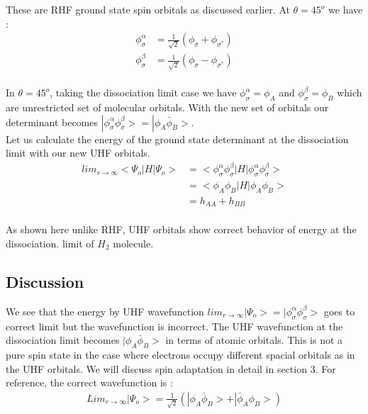 \documentclass[11pt]{article}   	%
\begin{document}
	These are RHF ground state spin orbitals as discussed earlier. At $\theta=45^o$ we have :\\
	\begin{equation}
	\begin{split}
		\phi_{\sigma}^{\alpha}&=\frac{1}{\sqrt{2}}(\phi_{\sigma}+\phi_{\sigma^*})\\
		\phi_{\sigma}^{\beta}&=\frac{1}{\sqrt{2}}(\phi_{\sigma}-\phi_{\sigma^*})\\
	\end{split}
	\end{equation}
	
	In $\theta=45^o$, taking the dissociation limit case we have 
	$\phi_{\sigma}^{\alpha}=\phi_A$ and $\phi_{\sigma}^{\beta}=\phi_B$ which are unrestricted set of 
	molecular orbitals.
	With the new set of orbitals our determinant becomes $|\phi_{\sigma}^{\alpha}\phi_{\sigma}^{\beta}>
	=|\phi_A\bar{\phi}_B>$.\\ 
	
	Let us calculate the energy of the ground state determinant at the dissociation limit with our new UHF orbitals. \\
	\begin{equation}
		\begin{split}
			lim_{r\rightarrow \infty}<\Psi_o|H|\Psi_o>&=<\phi_{\sigma}^{\alpha}
			\phi_{\sigma}^{\beta}|H|\phi_{\sigma}^{\alpha}\phi_{\sigma}^{\beta}>\\
				&=<\phi_A\phi_B|H|\phi_A\phi_B>\\
				&=h_{AA}+h_{BB}\\
		\end{split}
	\end{equation}
	
	As shown here unlike RHF, UHF orbitals show correct behavior of energy at the dissociation. 
	limit of $H_2$ molecule.\\
	\subsection{Discussion}
	We see that the energy by UHF wavefunction $lim_{r\rightarrow\infty}|\Psi_o>=|\phi_{\sigma}^{\alpha}\phi_{\sigma}^{\beta}>$ goes to
	correct limit but the wavefunction is incorrect. The UHF wavefunction at the dissociation limit
	 becomes $|\phi_A\bar{\phi}_B>$ in terms of atomic orbitals. This is not a pure spin state in the case where electrons occupy
	 different spacial orbitals as in the UHF orbitals. We will discuss spin adaptation in detail in section 3.
	For reference, the correct wavefunction is :\\
	\begin{equation}
	\begin{split}
		Lim_{r\rightarrow\infty}|\Psi_o>=\frac{1}{\sqrt{2}}(|\phi_A\bar{\phi}_B>+|\bar{\phi}_A\phi_B>)
	\end{split}
	\end{equation}
\end{document}
